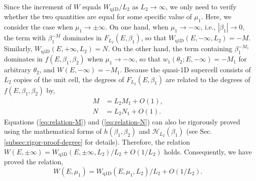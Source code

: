 Since the increment of $W$ equals $W_{\text{q1D}}/L_{2}$ as $L_{2}\rightarrow\infty$,
we only need to verify whether the two quantities are equal for some
specific value of $\mu_{1}$. Here, we consider the case when $\mu_{1}\rightarrow\pm\infty$.
On one hand, when $\mu_{1}\rightarrow-\infty$, i.e., $|\beta_{1}|\rightarrow0$,
the term with $\beta_{1}^{-M}$ dominates in $F_{L_{2}}(E,\beta_{1})$,
so that $W_{\text{q1D}}(E,-\infty,L_{2})=-M$. Similarly, $W_{\text{q1D}}(E,+\infty,L_{2})=N$.
On the other hand, the term containing $\beta_{1}^{-M_{1}}$ dominates
in $f(E,\beta_{1},\beta_{2})$ when $\mu_{1}\rightarrow-\infty$,
so that $w_{1}(\theta_{2};E,-\infty)=-M_{1}$ for arbitrary $\theta_{2}$,
and $W(E,-\infty)=-M_{1}$. Because the quasi-1D supercell consists
of $L_{2}$ copies of the unit cell, the degrees of $F_{L_{2}}(E,\beta_{1})$
are related to the degrees of $f(E,\beta_{1},\beta_{2})$ by, 
\begin{align}
M & =L_{2}M_{1}+O(1),\label{eq:relation-M}\\
N & =L_{2}N_{1}+O(1).\label{eq:relation-N}
\end{align}
Equations (\ref{eq:relation-M}) and (\ref{eq:relation-N}) can also
be rigorously proved using the mathematical forms of $h(\beta_{1},\beta_{2})$
and $\mathcal{H}_{L_{2}}(\beta_{1})$ (see Sec. \ref{subsec:rigor-proof-degree}
for details). Therefore, the relation $W(E,\pm\infty)=W_{\text{q1D}}(E,\pm\infty,L_{2})/L_{2}+O(1/L_{2})$
holds. Consequently, we have proved the relation, 
\begin{equation}
W\left(E,\mu_{1}\right)=W_{\text{q1D}}\left(E,\mu_{1},L_{2}\right)/L_{2}+O\left(1/L_{2}\right).\label{eq:relation-winding}
\end{equation}


